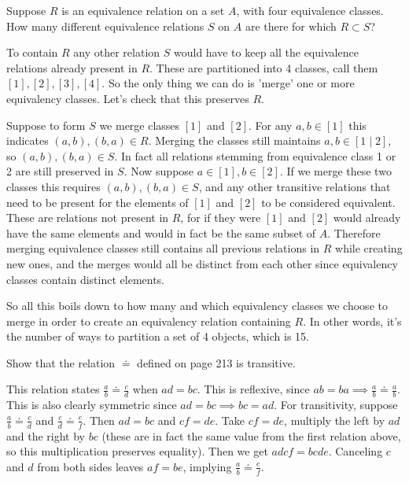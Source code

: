 \documentclass{article}
\begin{document}
\begin{problem}
Suppose $R$ is an equivalence relation on a set $A$, with four equivalence classes. How many different equivalence relations $S$ on $A$ are there for which $R \subset S$?
\end{problem}

To contain $R$ any other relation $S$ would have to keep all the equivalence relations already present in $R$. These are partitioned into 4 classes, call them $[1], [2], [3], [4]$. So the only thing we can do is 'merge' one or more equivalency classes. Let's check that this preserves $R$.

Suppose to form $S$ we merge classes $[1]$ and $[2]$. For any $a, b \in [1]$ this indicates $(a, b), (b, a) \in R$. Merging the classes still maintains $a, b \in [1\mid 2]$, so $(a, b), (b, a) \in S$. In fact all relations stemming from equivalence class 1 or 2 are still preserved in $S$. Now suppose $a \in [1], b \in [2]$. If we merge these two classes this requires $(a, b), (b, a) \in S$, and any other transitive relations that need to be present for the elements of $[1]$ and $[2]$ to be considered equivalent. These are relations not present in $R$, for if they were $[1]$ and $[2]$ would already have the same elements and would in fact be the same subset of $A$. Therefore merging equivalence classes still contains all previous relations in $R$ while creating new ones, and the merges would all be distinct from each other since equivalency classes contain distinct elements.

So all this boils down to how many and which equivalency classes we choose to merge in order to create an equivalency relation containing $R$. In other words, it's the number of ways to partition a set of 4 objects, which is 15.

\begin{problem}
Show that the relation $\doteq$ defined on page 213 is transitive.
\end{problem}

This relation states $\frac{a}{b}\doteq\frac{c}{d}$ when $ad = bc$. This is reflexive, since $ab = ba \implies \frac{a}{b}\doteq\frac{a}{b}$. This is also clearly symmetric since $ad = bc \implies bc = ad$. For transitivity, suppose $\frac{a}{b}\doteq\frac{c}{d}$ and $\frac{c}{d}\doteq\frac{e}{f}$. Then $ad = bc$ and $cf = de$. Take $cf = de$, multiply the left by $ad$ and the right by $bc$ (these are in fact the same value from the first relation above, so this multiplication preserves equality). Then we get $adcf = bcde$. Canceling $c$ and $d$ from both sides leaves $af = be$, implying $\frac{a}{b}\doteq\frac{e}{f}$.
\end{document}
